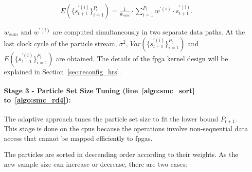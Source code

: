 \begin{equation}
\begin{aligned}
E(\{s_{t+1}^{'(i)}\}^{P_t}_{i=1}) = \frac{1}{w_{sum}} \cdot \sum_{i=1}^{P_{t}} w^{'(i)} \cdot s_{t+1}^{'(i)} \mbox{.}
\end{aligned}
\label{eqt:bound8}
\end{equation}

$w_{sum}$ and $w^{'(i)}$ are computed simultaneously in two separate data paths.
At the last clock cycle of the particle stream, $\sigma^2$, $Var(\{s_{t+1}^{'(i)}\}^{P_t}_{i=1})$ and $E(\{s_{t+1}^{'(i)}\}^{P_t}_{i=1})$ are obtained.
The details of the \gls{fpga} kernel design will be explained in Section~\ref{sec:reconfig_hrs}.


\paragraph{Stage 3 - Particle Set Size Tuning (line~\ref{algo:smc_sort} to~\ref{algo:smc_rd4}): }

The adaptive approach tunes the particle set size to fit the lower bound $P_{t+1}$.
This stage is done on the \glspl{cpu} because the operations involve non-sequential data access that cannot be mapped efficiently to \glspl{fpga}.

The particles are sorted in descending order according to their weights.
As the new sample size can increase or decrease, there are two cases:

